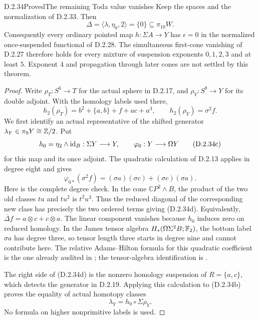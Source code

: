 \begin{claim}{D.2.34}{Proved}{The remaining Toda value vanishes}
Keep the spaces and the normalization of \textup{D.2.33}. Then
\[
 \Delta=\langle\lambda,\eta_8,2\rangle
             =\{0\}\subseteq\pi_{10}W.
 \tag{D.2.34a}
\]
Consequently every ordinary pointed map
$h:\Sigma A\to Y$ has $\epsilon=0$ in the normalized
once-suspended functional of \textup{D.2.28}.
The simultaneous first-cone vanishing of \textup{D.2.27}
therefore holds for every mixture of suspension exponents
$0,1,2,3$ and at least $5$. Exponent $4$ and propagation
through later cones are not settled by this theorem.
\end{claim}
\begin{proof}
Write $\rho_T:S^6\to T$ for the actual sphere in
\textup{D.2.17}, and $\rho_Y:S^8\to Y$ for its double
adjoint. With the homology labels used there,
\[
 h_2(\rho_T)=b^2+\{a,b\}+f+ac+a^3,
       \qquad h_2(\rho_Y)=\sigma^2f.
 \tag{D.2.34b}
\]
We first identify an actual representative of the shifted
generator $\lambda_Y\in\pi_9Y\cong\mathbb Z/2$.
Put
\[
 h_0=\eta_2\wedge\mathrm{id}_B:\Sigma Y\longrightarrow Y,
       \qquad \varphi_0:Y\longrightarrow\Omega Y
 \tag{D.2.34c}
\]
for this map and its once adjoint. The quadratic calculation
of \textup{D.2.13} applies in degree eight and gives
\[
 \varphi_{0*}(\sigma^2f)
       =(\sigma a)(\sigma c)+(\sigma c)(\sigma a).
 \tag{D.2.34d}
\]
Here is the complete degree check. In the cone
$\mathbb CP^2\wedge B$, the product of the two old
classes $tu$ and $tu^2$ is $t^2u^3$. Thus the reduced
diagonal of the corresponding new class has precisely
the two ordered terms giving \textup{(D.2.34d)}.
Equivalently, $\overline\Delta f=a\otimes c+c\otimes a$.
The linear component vanishes because $h_0$ induces zero
on reduced homology. In the James tensor algebra
$H_*(\Omega\Sigma^2B;\mathbb F_2)$, the bottom label
$\sigma a$ has degree three, so tensor length three
starts in degree nine and cannot contribute here.
The relative Adams--Hilton formula for this quadratic
coefficient is the one already audited in
\cite[\S3.1, p.~300; proof of Proposition~7.4,
p.~309]{FGHHalperinLemaire1995}; the tensor-algebra
identification is \cite[\S3; Theorem~5.6 and
Corollary~5.7]{I_James1955}.

The right side of \textup{(D.2.34d)} is the nonzero
homology suspension of $R=\{a,c\}$, which detects the
generator in \textup{D.2.19}. Applying this calculation
to \textup{(D.2.34b)} proves the equality of actual
homotopy classes
\[
                 \lambda_Y=h_0\circ\Sigma\rho_Y.
 \tag{D.2.34e}
\]
No formula on higher nonprimitive labels is used.


\end{proof}
